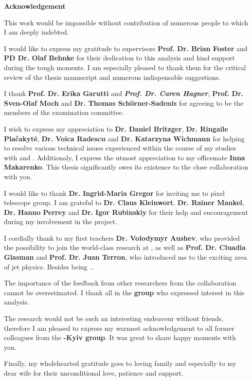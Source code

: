 \thispagestyle{empty}
\begin{center}
\huge\textbf{Acknowledgement}
\end{center}

This work would be impossible without contribution of numerous people to which I am deeply indebted. 

I would like to express my gratitude to supervisors \textbf{Prof. Dr. Brian Foster} and \textbf{PD Dr. Olaf Behnke} for their dedication to this analysis and kind support during the tough moments. I am especially pleased to thank them for the critical review of the thesis manuscript and numerous indispensable suggestions. 

I thank \textbf{Prof. Dr. Erika Garutti} and \textbf{\sl{Prof. Dr. Caren Hagner}}, \textbf{Prof. Dr. Sven-Olaf Moch} and  \textbf{Dr. Thomas Sch\"{o}rner-Sadenis} for agreeing to be the members of the examination committee.

I wish to express my appreciation to \textbf{Dr. Daniel Britzger}, \textbf{Dr. Ringaile Pla\v{c}akyt\.{e}}, \textbf{Dr. Voica Radescu} and \textbf{Dr. Katarzyna Wichmann} for helping to resolve various technical issues experienced within the course of my studies with \fastnlo and \herafitter. Additionaly, I express the utmost appreciation to my officemate \textbf{Inna Makarenko}. This thesis significantly owes its existence to the close collaboration with you.

I would like to thank \textbf{Dr. Ingrid-Maria Gregor} for inviting me to \desy pixel telescope group. I am grateful to \textbf{Dr. Claus Kleinwort}, \textbf{Dr. Rainer Mankel}, \textbf{Dr. Hanno Perrey} and \textbf{Dr. Igor Rubinskiy} for their help and encouragement during my involvement in the \eutelescope project.

I cordially thank to my first teachers \textbf{Dr. Volodymyr Aushev}, who provided the possibility to join the world-class research at \desy, as well as \textbf{Prof. Dr. Cluadia Glasman} and \textbf{Prof. Dr. Juan Terron}, who introduced me to the exciting area of jet physics. Besides being ..

The importance of the feedback from other researchers from the \zeus collaboration cannot be overestimated. I thank all in the \textbf{\zeus group} who expressed interest in this analysis.

The research would not be such an interesting endeavour without friends, therefore I am pleased to express my warmest acknowledgement to all former colleagues from the \textbf{\zeus-Kyiv group}. It was great to share happy moments with you.

Finally, my wholehearted gratitude goes to loving family and especially to my dear wife for their unconditional love, patience and support.